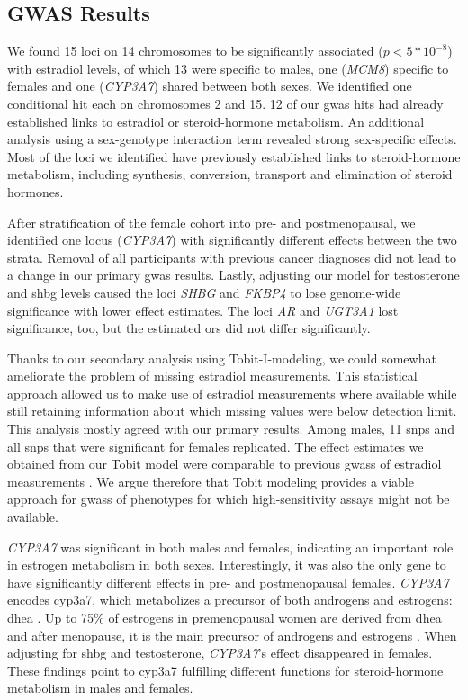 \documentclass[twoside=false]{scrbook}
\begin{document}
\subsection{GWAS Results}
We found 15 loci on 14 chromosomes to be significantly associated ($p < 5*10^{-8}$) with estradiol levels, of which 13 were specific to males, one (\textit{MCM8}) specific to females and one (\textit{CYP3A7}) shared between both sexes.
We identified one conditional hit each on chromosomes 2 and 15.
12 of our \gls{gwas} hits had already established links to estradiol or steroid-hormone metabolism.
An additional analysis using a sex-genotype interaction term revealed strong sex-specific effects.
Most of the loci we identified have previously established links to steroid-hormone metabolism, including synthesis, conversion, transport and elimination of steroid hormones.

After stratification of the female cohort into pre- and postmenopausal, we identified one locus (\textit{CYP3A7}) with significantly different effects between the two strata.
Removal of all participants with previous cancer diagnoses did not lead to a change in our primary \gls{gwas} results.
Lastly, adjusting our model for testosterone and \gls{shbg} levels caused the loci \textit{SHBG} and \textit{FKBP4} to lose genome-wide significance with lower effect estimates.
The loci \textit{AR} and \textit{UGT3A1} lost significance, too, but the estimated \glspl{or} did not differ significantly.

Thanks to our secondary analysis using Tobit-I-modeling, we could somewhat ameliorate the problem of missing estradiol measurements.
This statistical approach allowed us to make use of estradiol measurements where available while still retaining information about which missing values were below detection limit.
This analysis mostly agreed with our primary results.
Among males, 11 \glspl{snp} and all \glspl{snp} that were significant for females replicated.
The effect estimates we obtained from our Tobit model were comparable to previous \glspl{gwas} of estradiol measurements \cite{Prescott2012f, Eriksson2018b,Pott2019e}.
We argue therefore that Tobit modeling provides a viable approach for \glspl{gwas} of phenotypes for which high-sensitivity assays might not be available.

\textit{CYP3A7} was significant in both males and females, indicating an important role in estrogen metabolism in both sexes.
Interestingly, it was also the only gene to have significantly different effects in pre- and postmenopausal females.
\textit{CYP3A7} encodes \gls{cyp3a7}, which metabolizes a precursor of both androgens and estrogens: \gls{dhea} \cite{Ohmori1998}.
Up to 75\% of estrogens in premenopausal women are derived from \gls{dhea} and after menopause, it is the main precursor of androgens and estrogens \cite{Simpson2001}.
When adjusting for \gls{shbg} and testosterone, \textit{CYP3A7}'s effect disappeared in females.
These findings point to \gls{cyp3a7} fulfilling different functions for steroid-hormone metabolism in males and females.
\end{document}
